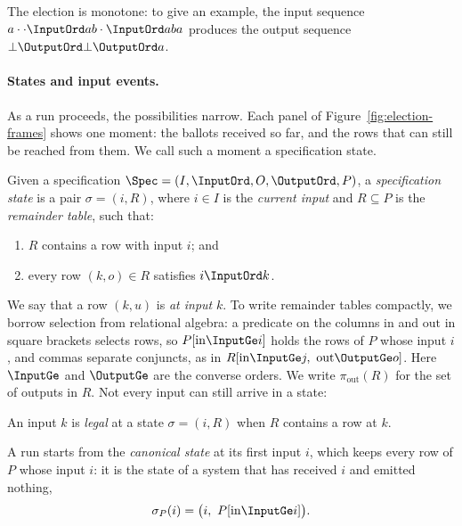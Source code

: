 The election is monotone: to give an example, the input sequence
$a\cdot\cdot\InputOrd ab\cdot\InputOrd aba$ produces the output sequence
$\bot\OutputOrd\bot\OutputOrd a$.

\paragraph{States and input events.}
As a run proceeds, the possibilities narrow.  Each panel of
Figure~\ref{fig:election-frames} shows one moment: the ballots received so
far, and the rows that can still be reached from them.  We call such a moment
a specification state.

\begin{definition}
\label{def:residual-state}
Given a specification $\Spec=(I,\InputOrd,O,\OutputOrd,P)$, a \emph{specification state} is a
pair $\sigma=(i,R)$, where $i\in I$ is the \emph{current input} and
$R\subseteq P$ is the \emph{remainder table}, such that:
\begin{enumerate}
  \item $R$ contains a row with input $i$; and
  \item every row $(k,o)\in R$ satisfies $i\InputOrd k$.
\end{enumerate}
\end{definition}

We say that a row $(k,u)$ is
\emph{at input} $k$.  To write remainder tables compactly, we borrow selection
from relational algebra: a predicate on the columns $\mathrm{in}$ and
$\mathrm{out}$ in square brackets selects rows, so $P[\mathrm{in}\InputGe i]$
holds the rows of $P$ whose input \inrel $i$, and commas separate conjuncts, as
in $R[\mathrm{in}\InputGe j,\ \mathrm{out}\OutputGe o]$.  Here $\InputGe$ and
$\OutputGe$ are the converse orders.  We write $\pi_{\mathrm{out}}(R)$ for the
set of outputs in $R$.  Not every input can still arrive in a state:

\begin{definition}
\label{def:legal-input}
An input $k$ is \emph{legal} at a state $\sigma=(i,R)$ when $R$ contains a row at $k$.
\end{definition}

A run starts from the \emph{canonical state} at its first input $i$, which
keeps every row of $P$ whose input \inrel $i$: it is the state of a system that
has received $i$ and emitted nothing,
\begin{equation}
  \sigma_P(i)=\bigl(i,\ P[\mathrm{in}\InputGe i]\bigr).
  \label{eq:canonical-state}
\end{equation}

